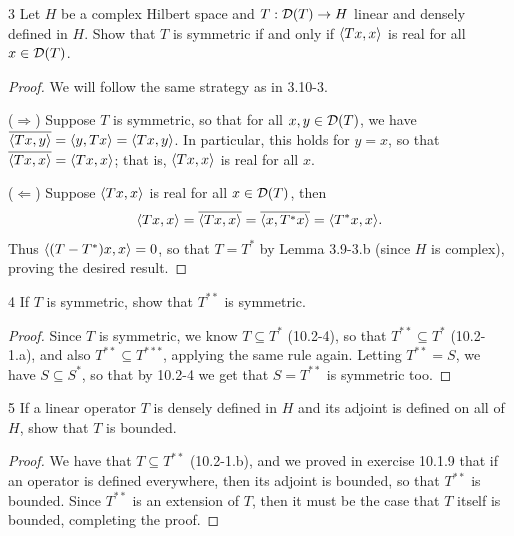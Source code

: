 \begin{exercise}{3}
Let $H$ be a complex Hilbert space and $T: \mathcal{D}(T) \to H$ linear and densely defined in $H$.
Show that $T$ is symmetric if and only if $\langle Tx, x\rangle$ is real for all $x \in \mathcal{D}(T)$.
\end{exercise}
\begin{proof}
We will follow the same strategy as in 3.10-3.

($\Rightarrow$)
Suppose $T$ is symmetric, so that for all $x, y \in \mathcal{D}(T)$, we have $\overline{\langle Tx, y\rangle} = \langle y, Tx\rangle = \langle Tx, y\rangle$. 
In particular, this holds for $y = x$, so that $\overline{\langle Tx, x\rangle} = \langle Tx, x\rangle$;
that is, $\langle Tx, x\rangle$ is real for all $x$.

($\Leftarrow$)
Suppose $\langle Tx, x\rangle$ is real for all $x \in \mathcal{D}(T)$, then 
\begin{align*}
    \langle Tx, x\rangle 
    = \overline{\langle Tx, x\rangle} 
    = \overline{\langle x, T^\ast x\rangle}
    = \langle T^\ast x, x\rangle.
\end{align*}
Thus $\langle (T - T^\ast)x, x\rangle = 0$, so that $T = T^\ast$ by Lemma 3.9-3.b  (since $H$ is complex), proving the desired result.

\end{proof} 

\begin{exercise}{4}
If $T$ is symmetric, show that $T^{\ast \ast}$ is symmetric.
\end{exercise}
\begin{proof}
Since $T$ is symmetric, we know $T \subseteq T^\ast$ (10.2-4), so that $T^{\ast \ast} \subseteq T^\ast$ (10.2-1.a), and also $T^{\ast \ast} \subseteq T^{\ast \ast \ast}$, applying the same rule again.
Letting $T^{\ast \ast} = S$, we have $S \subseteq S^\ast$, so that by 10.2-4 we get that $S = T^{\ast \ast}$ is symmetric too.
\end{proof} 

\begin{exercise}{5}
If a linear operator $T$ is densely defined in $H$ and its adjoint is defined on all of $H$, show that $T$ is bounded.
\end{exercise}
\begin{proof}
We have that $T \subseteq T^{\ast \ast}$ (10.2-1.b), and we proved in exercise 10.1.9 that if an operator is defined everywhere, then its adjoint is bounded, so that $T^{\ast \ast}$ is bounded.
Since $T^{\ast \ast}$ is an extension of $T$, then it must be the case that $T$ itself is bounded, completing the proof.
\end{proof} 


